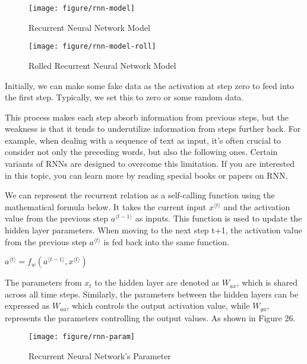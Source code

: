 \documentclass{article}
\begin{document}
\begin{figure}[htbp]
        \centering
        \texttt{[image: figure/rnn-model]}
        \caption{Recurrent Neural Network Model}
     \end{figure}
     

\begin{figure}[htbp]
        \centering
        \texttt{[image: figure/rnn-model-roll]}
        \caption{Rolled Recurrent Neural Network Model}
     \end{figure}

Initially, we can make some fake data as the activation at step zero to feed into the first step. Typically, we set this to zero or some random data.

This process makes each step absorb information from previous steps, but the weakness is that it tends to underutilize information from steps further back. For example, when dealing with a sequence of text as input, it's often crucial to consider not only the preceding words, but also the following ones. Certain variants of RNNs are designed to overcome this limitation. If you are interested in this topic, you can learn more by reading special books or papers on RNN.

We can represent the recurrent relation as a self-calling function using the mathematical formula below. It takes the current input $x^{\langle t\rangle}$ and the activation value from the previous step $a^{\langle {t-1}\rangle}$ as inputs. This function is used to update the hidden layer parameters. When moving to the next step t+1, the activation value from the previous step $a^{\langle t\rangle}$ is fed back into the same function.

\hspace*{\fill}

$a^{\langle t\rangle}=f_w\left(a^{\langle {t-1}\rangle}, x^{\langle t\rangle}\right)$\\
\hspace*{\fill}

The parameters from $x_t$ to the hidden layer are denoted as $W_{ax}$, which is shared across all time steps. Similarly, the parameters between the hidden layers can be expressed as $W_{aa}$, which controls the output activation value, while  $W_{ya}$, represents the parameters controlling the output values. As shown in Figure 26. 

\begin{figure}[htbp]
        \centering
        \texttt{[image: figure/rnn-param]}
        \caption{Recurrent Neural Network's Parameter}
     \end{figure}
\end{document}
